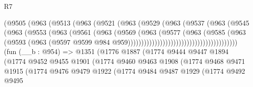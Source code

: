 \begin{lexlean}{R7}
\begin{coremodule}
                                    (@9505
                                      (@963
                                        (@9513
                                          (@963
                                            (@9521
                                              (@963
                                                (@9529
                                                  (@963
                                                    (@9537
                                                      (@963
                                                        (@9545
                                                          (@963
                                                            (@9553
                                                              (@963
                                                                (@9561
                                                                  (@963
                                                                    (@9569
                                                                      (@963
                                                                        (@9577
                                                                          (@963
                                                                            (@9585
                                                                              (@963
                                                                                (@9593
                                                                                  (@963
                                                                                    (@9597
                                                                                      @9599
                                                                                      @984
                                                                                      @959)))))))))))))))))))))))))))))))))))))))))
    (fun (__b : @954) =>
    @1351
      (@1776
        @1887
        (@1774
          @9444
          @9447
          @1894
          (@1774
            @9452
            @9455
            @1901
            (@1774
              @9460
              @9463
              @1908
              (@1774
                @9468
                @9471
                @1915
                (@1774
                  @9476
                  @9479
                  @1922
                  (@1774
                    @9484
                    @9487
                    @1929
                    (@1774
                      @9492
                      @9495

\end{coremodule}
\end{lexlean}
